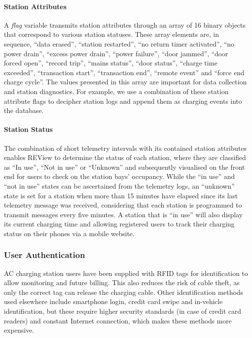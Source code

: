 \paragraph{Station Attributes}A \textit{flag} variable transmits station attributes through an array of 16 binary objects that correspond to various station statuses. These array elements are, in sequence, “data erased”, “station restarted”, “no return timer activated”, “no power drain”, “excess power drain”, “power failure”, “door jammed”, “door forced open”, “record trip”, “mains status”, “door status”, “charge time exceeded”, “transaction start”, “transaction end”, “remote event” and “force end charge cycle”. The values presented in this array are important for data collection and station diagnostics. For example, we use a combination of these station attribute flags to decipher station logs and append them as charging events into the database.

\paragraph{Station Status} The combination of short telemetry intervals with its contained station attributes enables REView to determine the status of each station, where they are classified as “In use”, “Not in use” or “Unknown” and subsequently visualised on the front end for users to check on the station bays’ occupancy. While the “in use” and “not in use” states can be ascertained from the telemetry logs, an “unknown” state is set for a station when more than 15 minutes have elapsed since its last telemetry message was received, considering that each station is programmed to transmit messages every five minutes. A station that is “in use” will also display its current charging time and allowing registered users to track their charging status on their phones via a mobile website.

\subsubsection{User Authentication}
AC charging station users have been supplied with RFID tags for identification to allow monitoring and future billing. This also reduces the risk of cable theft, as only the correct tag can release the charging cable. Other identification methods used elsewhere include smartphone login, credit card swipe and in-vehicle identification, but these require higher security standards (in case of credit card readers) and constant Internet connection, which makes these methods more expensive.

